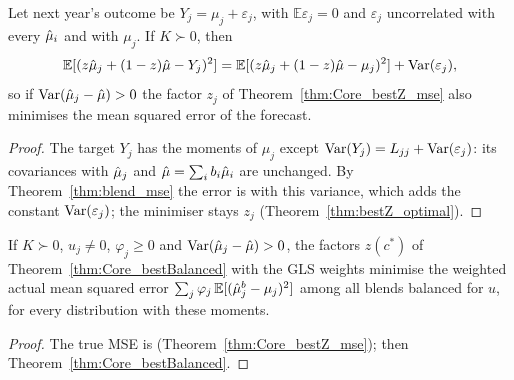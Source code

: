 \begin{corollary}\label{cor:Core_forecast}
  \leanok
  Let next year's outcome be $Y_j = \mu_j + \varepsilon_j$, with $\mathbb E\varepsilon_j = 0$
  and $\varepsilon_j$ uncorrelated with every $\hat\mu_i$ and with $\mu_j$. If $K \succ 0$, then
  \[
    \mathbb E[(z\hat\mu_j + (1-z)\hat\mu - Y_j)^2] = \mathbb E[(z\hat\mu_j + (1-z)\hat\mu - \mu_j)^2]
      + \operatorname{Var}(\varepsilon_j),
  \]
  so if $\operatorname{Var}(\hat\mu_j - \hat\mu) > 0$ the factor $z_j$ of Theorem~\ref{thm:Core_bestZ_mse}
  also minimises the mean squared error of the forecast.
\end{corollary}
\begin{proof}
  \leanok
  The target $Y_j$ has the moments of $\mu_j$ except $\operatorname{Var}(Y_j) = L_{jj} + \operatorname{Var}(\varepsilon_j)$:
  its covariances with $\hat\mu_j$ and $\hat\mu = \sum_i b_i\hat\mu_i$ are unchanged. By
  Theorem~\ref{thm:blend_mse} the error is  with this variance, which adds the
  constant $\operatorname{Var}(\varepsilon_j)$; the minimiser stays $z_j$ (Theorem~\ref{thm:bestZ_optimal}).
\end{proof}

\begin{corollary}\label{cor:Core_bestBalanced_mse}
  \leanok
  If $K \succ 0$, $u_j \ne 0$, $\varphi_j \ge 0$ and $\operatorname{Var}(\hat\mu_j - \hat\mu) > 0$,
  the factors $z(c^*)$ of Theorem~\ref{thm:Core_bestBalanced} with the GLS
  weights minimise the weighted actual mean squared error
  $\sum_j\varphi_j\,\mathbb E[(\hat\mu_j^b - \mu_j)^2]$ among all blends balanced
  for $u$, for every distribution with these moments.
\end{corollary}
\begin{proof}
  \leanok
  The true MSE is  (Theorem~\ref{thm:Core_bestZ_mse}); then
  Theorem~\ref{thm:Core_bestBalanced}.
\end{proof}

